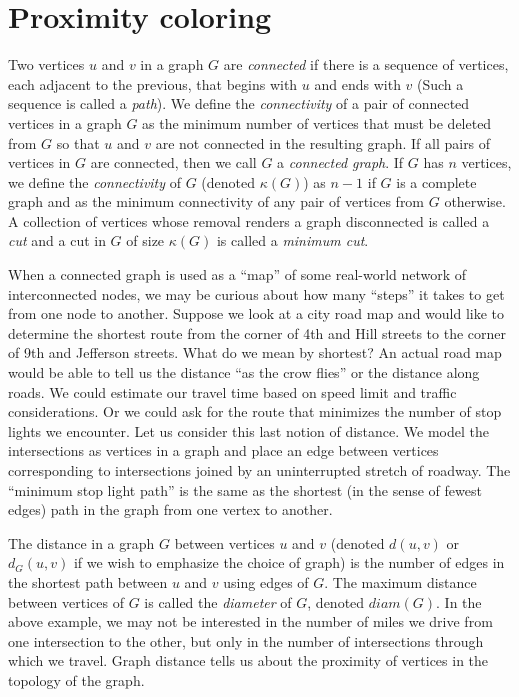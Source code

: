 \section{Proximity coloring}

Two vertices $u$ and $v$ in a graph $G$ are {\it connected} if there is a sequence of vertices, each adjacent to the previous, that begins with $u$ and ends with $v$ (Such a sequence is called a {\it path}).  We define the {\it connectivity} of a pair of connected vertices in a graph $G$ as the minimum number of vertices that must be deleted from $G$ so that $u$ and $v$ are not connected in the resulting graph. If all pairs of vertices in $G$ are connected, then we call $G$ a {\it connected graph}. If $G$ has $n$ vertices, we define the {\it connectivity} of $G$ (denoted $\kappa(G)$) as $n-1$ if $G$ is a complete graph and as the minimum connectivity of any pair of vertices from $G$ otherwise. A collection of vertices whose removal renders a graph disconnected is called a {\it cut} and a cut in $G$ of size $\kappa(G)$ is called a {\it minimum cut}.

When a connected graph is used as a ``map'' of some real-world network of interconnected nodes, we may be curious about how many ``steps'' it takes to get from one node to another.  Suppose we look at a city road map and would like to determine the shortest route from the corner of 4th and Hill streets to the corner of 9th and Jefferson streets.  What do we mean by shortest?  An actual road map would be able to tell us the distance ``as the crow flies'' or the distance along roads.  We could estimate our travel time based on speed limit and traffic considerations.  Or we could ask for the route that minimizes the number of stop lights we encounter. Let us consider this last notion of distance.  We model the intersections as vertices in a graph and place an edge between vertices corresponding to intersections joined by an uninterrupted stretch of roadway.  The ``minimum stop light path'' is the same as the shortest (in the sense of fewest edges) path in the graph from one vertex to another.  

The distance in a graph $G$ between vertices $u$ and $v$ (denoted $d(u,v)$ or $d_G(u,v)$ if we wish to emphasize the choice of graph) is the number of edges in the shortest path between $u$ and $v$ using edges of $G$.  The maximum distance between vertices of $G$ is called the {\it diameter} of $G$, denoted $diam(G)$. 
  In the above example, we may not be interested in the number of miles we drive from one intersection to the other, but only in the number of intersections through which we travel.  Graph distance tells us about the proximity of vertices in the topology of the graph. 

